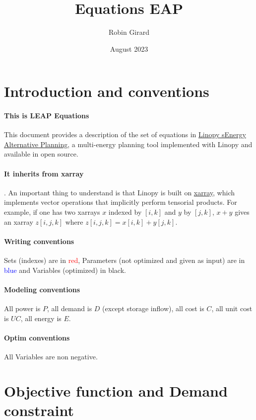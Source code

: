 \documentclass{article}
\title{Equations EAP}
\author{Robin Girard }
\date{August 2023}
\begin{document}
\maketitle
\tableofcontents
\footnotesize
\section{Introduction and conventions}
\paragraph{This is LEAP Equations} This document provides a description of the set of equations in \href{https://github.com/robingirard/Energy-Alternatives-Planning/blob/master/Models/Linopy/f_planningModels_linopy.py}{Linopy sEnergy Alternative Planning}, a multi-energy planning tool implemented with Linopy and available in open source. 
\\

\paragraph{It inherits from xarray}. An important thing to understand is that Linopy is built on \href{https://docs.xarray.dev/en/stable/}{xarray}, which implements vector operations that implicitly perform tensorial products. For example, if one has two xarrays $x$ indexed by $[i,k]$ and $y$ by $[j, k]$, $x + y$ gives an xarray $z[i,j,k]$ where $z[i,j,k] = x[i,k]+ y[j,k]$.


\paragraph{Writing conventions}
Sets (indexes) are in \textcolor{red}{red}, Parameters (not optimized and given as input) are in \textcolor{blue}{blue} and Variables (optimized) in black.

\paragraph{Modeling conventions}
All power is $P$, all demand is $D$ (except storage inflow), all cost is $C$, all unit cost is $UC$, all energy is $E$. 

\paragraph{Optim conventions}
All Variables are non negative. 


\newpage
\section{Objective function and Demand constraint}
\end{document}
